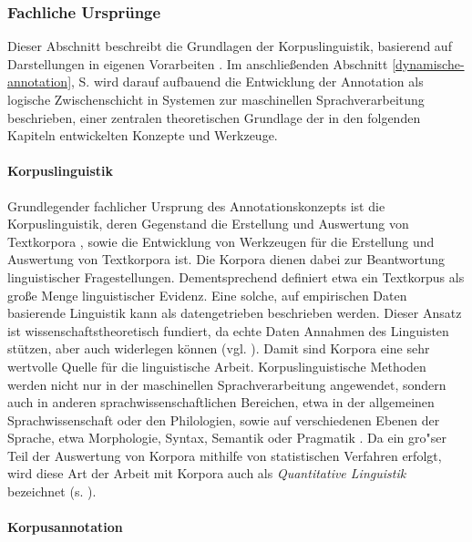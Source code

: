 \documentclass[abstracton, 12pt]{scrartcl}
\begin{document}
\subsubsection{Fachliche Ursprünge}\label{ml-base-corpus} \label{anno-grundlagen-fachlich}

Dieser Abschnitt beschreibt die Grundlagen der Korpuslinguistik, basierend auf Darstellungen in eigenen Vorarbeiten \citep{Steeg2007}. Im anschließenden Abschnitt \ref{dynamische-annotation}, S. \pageref{dynamische-annotation} wird darauf aufbauend die Entwicklung der Annotation als logische Zwischenschicht in Systemen zur maschinellen Sprachverarbeitung beschrieben, einer zentralen theoretischen Grundlage der in den folgenden Kapiteln entwickelten Konzepte und Werkzeuge.

\paragraph{Korpuslinguistik}

Grundlegender fachlicher Ursprung des Annotationskonzepts ist die Korpuslinguistik, deren Gegenstand die Erstellung und Auswertung von Textkorpora \citep{Koehler2005}, sowie die Entwicklung von Werkzeugen für die Erstellung und Auswertung von Textkorpora ist. Die Korpora dienen dabei zur Beantwortung linguistischer Fragestellungen. Dementsprechend definiert etwa \citet{McEnery2003} ein Textkorpus als große Menge linguistischer Evidenz. Eine solche, auf empirischen Daten basierende Linguistik kann als datengetrieben beschrieben werden. Dieser Ansatz ist wissenschaftstheoretisch fundiert, da echte Daten Annahmen des Linguisten stützen, aber auch widerlegen können (vgl. \citealt{Labov1975,Labov1996}). Damit sind Korpora eine sehr wertvolle Quelle für die linguistische Arbeit. Korpuslinguistische Methoden werden nicht nur in der maschinellen Sprachverarbeitung angewendet, sondern auch in anderen sprachwissenschaftlichen Bereichen, etwa in der allgemeinen Sprachwissenschaft oder den Philologien, sowie auf verschiedenen Ebenen der Sprache, etwa Morphologie, Syntax, Semantik oder Pragmatik \citep[2]{McEneryAndWilson1996}. Da ein gro"ser Teil der Auswertung von Korpora mithilfe von statistischen Verfahren erfolgt, wird diese Art der Arbeit mit Korpora auch als \emph{Quantitative Linguistik} bezeichnet (s. \citealt{ManningAndSchuetze1999, Koehler2005}). 

\paragraph{Korpusannotation} \label{korpusannotation}
\end{document}

